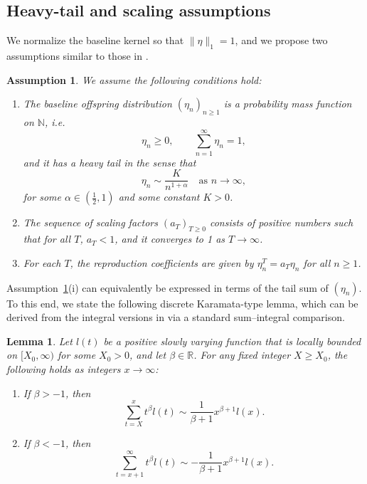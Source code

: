 \documentclass[letterpaper]{article}
\numberwithin{equation}{section}
\newtheorem{lemma}[theorem]{Lemma}
\newtheorem{assumption}[theorem]{Assumption}
\theoremstyle{definition}
\theoremstyle{remark}
\begin{document}
\subsection{Heavy-tail and scaling assumptions}

We normalize the baseline kernel so that $\|\eta\|_1=1$, and we propose two assumptions similar to those in \cite{jaisson2016rough}.

\begin{assumption}\label{assumption:1}
We assume the following conditions hold:
\begin{enumerate}
    \item The baseline offspring distribution $(\eta_n)_{n\ge1}$ is a probability mass function on $\mathbb N$, i.e.
    \[
      \eta_n\ge 0,\qquad \sum_{n=1}^\infty \eta_n=1,
    \]
    and it has a heavy tail in the sense that
    \[
      \eta_n \sim \frac{K}{n^{1+\alpha}}\quad \text{as } n\to\infty,
    \]
    for some $\alpha\in\left(\frac12,1\right)$ and some constant $K>0$.

    \item The sequence of scaling factors $(a_T)_{T\ge0}$ consists of positive numbers such that for all $T$, $a_T < 1$, and it converges to 1 as $T \to \infty$.

    \item For each $T$, the reproduction coefficients are given by $\eta_n^T = a_T \eta_n$ for all $n \ge 1$.
\end{enumerate}
\end{assumption}

{Assumption~\ref{assumption:1}(i) can equivalently be expressed in terms of the tail sum of $(\eta_n)$. To this end, we state the following discrete Karamata-type lemma, which can be derived from the integral versions in \cite[Prop.~1.5.8 and Prop.~1.5.10]{bingham1989regular} via a standard sum--integral comparison.}

\begin{lemma}\label{lemma:sumandnotsum}
  Let $l(t)$ be a {positive} slowly varying function that is locally bounded on $[X_0, \infty)$ for some $X_0 > 0$, and let $\beta\in\mathbb{R}$. For any fixed integer $X \ge X_0$, the following holds as integers $x \to \infty$:
  \begin{enumerate}
    \item {If $\beta > -1$, then}
    \[
      \sum_{t=X}^x t^\beta l(t) \sim \frac{1}{\beta+1}x^{\beta+1}l(x).
    \]
    \item {If $\beta < -1$, then}
    \[
      {\sum_{t=x+1}^\infty t^\beta l(t) \sim -\frac{1}{\beta+1}x^{\beta+1}l(x).}
    \]
  \end{enumerate}
\end{lemma}
\end{document}
